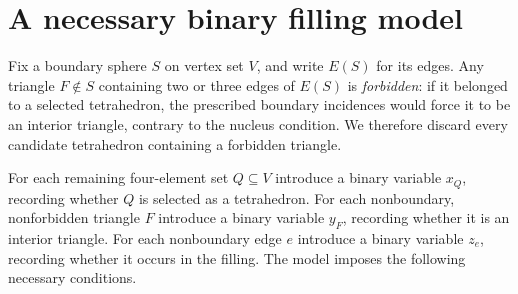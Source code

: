 \documentclass[11pt]{article}
\begin{document}
\section{A necessary binary filling model}\label{sec:binary-model}

Fix a boundary sphere $S$ on vertex set $V$, and write $E(S)$ for its
edges.  Any triangle $F\notin S$ containing two or three edges of $E(S)$
is \emph{forbidden}: if it belonged to a selected tetrahedron, the prescribed
boundary incidences would force it to be an interior triangle, contrary to
the nucleus condition.  We therefore discard every candidate tetrahedron
containing a forbidden triangle.

For each remaining four-element set $Q\subseteq V$ introduce a binary
variable $x_Q$, recording whether $Q$ is selected as a tetrahedron.  For
each nonboundary, nonforbidden triangle $F$ introduce a binary variable
$y_F$, recording whether it is an interior triangle.  For each nonboundary
edge $e$ introduce a binary variable $z_e$, recording whether it occurs in
the filling.  The model imposes the following necessary conditions.
\end{document}
